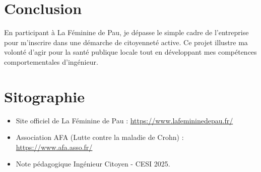 \newpage

\section*{Conclusion}
En participant à La Féminine de Pau, je dépasse le simple cadre de l'entreprise pour m'inscrire dans une démarche de citoyenneté active. Ce projet illustre ma volonté d'agir pour la santé publique locale tout en développant mes compétences comportementales d'ingénieur.

\newpage

\section*{Sitographie}
\begin{itemize}
    \item Site officiel de La Féminine de Pau : \url{https://www.lafemininedepau.fr/}
    \item Association AFA (Lutte contre la maladie de Crohn) : \url{https://www.afa.asso.fr/}
    \item Note pédagogique Ingénieur Citoyen - CESI 2025.
\end{itemize}
